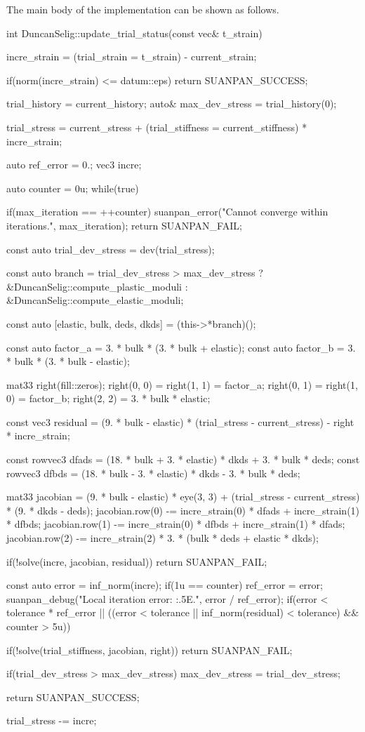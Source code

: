 The main body of the implementation can be shown as follows.
\begin{cppcode}
int DuncanSelig::update_trial_status(const vec& t_strain) {
    incre_strain = (trial_strain = t_strain) - current_strain;

    if(norm(incre_strain) <= datum::eps) return SUANPAN_SUCCESS;

    trial_history = current_history;
    auto& max_dev_stress = trial_history(0);

    trial_stress = current_stress + (trial_stiffness = current_stiffness) * incre_strain;

    auto ref_error = 0.;
    vec3 incre;

    auto counter = 0u;
    while(true) {
        if(max_iteration == ++counter) {
            suanpan_error("Cannot converge within {} iterations.\n", max_iteration);
            return SUANPAN_FAIL;
        }

        const auto trial_dev_stress = dev(trial_stress);

        const auto branch = trial_dev_stress > max_dev_stress ? &DuncanSelig::compute_plastic_moduli : &DuncanSelig::compute_elastic_moduli;

        const auto [elastic, bulk, deds, dkds] = (this->*branch)();

        const auto factor_a = 3. * bulk * (3. * bulk + elastic);
        const auto factor_b = 3. * bulk * (3. * bulk - elastic);

        mat33 right(fill::zeros);
        right(0, 0) = right(1, 1) = factor_a;
        right(0, 1) = right(1, 0) = factor_b;
        right(2, 2) = 3. * bulk * elastic;

        const vec3 residual = (9. * bulk - elastic) * (trial_stress - current_stress) - right * incre_strain;

        const rowvec3 dfads = (18. * bulk + 3. * elastic) * dkds + 3. * bulk * deds;
        const rowvec3 dfbds = (18. * bulk - 3. * elastic) * dkds - 3. * bulk * deds;

        mat33 jacobian = (9. * bulk - elastic) * eye(3, 3) + (trial_stress - current_stress) * (9. * dkds - deds);
        jacobian.row(0) -= incre_strain(0) * dfads + incre_strain(1) * dfbds;
        jacobian.row(1) -= incre_strain(0) * dfbds + incre_strain(1) * dfads;
        jacobian.row(2) -= incre_strain(2) * 3. * (bulk * deds + elastic * dkds);

        if(!solve(incre, jacobian, residual)) return SUANPAN_FAIL;

        const auto error = inf_norm(incre);
        if(1u == counter) ref_error = error;
        suanpan_debug("Local iteration error: {:.5E}.\n", error / ref_error);
        if(error < tolerance * ref_error || ((error < tolerance || inf_norm(residual) < tolerance) && counter > 5u)) {
            if(!solve(trial_stiffness, jacobian, right)) return SUANPAN_FAIL;

            if(trial_dev_stress > max_dev_stress) max_dev_stress = trial_dev_stress;

            return SUANPAN_SUCCESS;
        }

        trial_stress -= incre;
    }
}
\end{cppcode}

